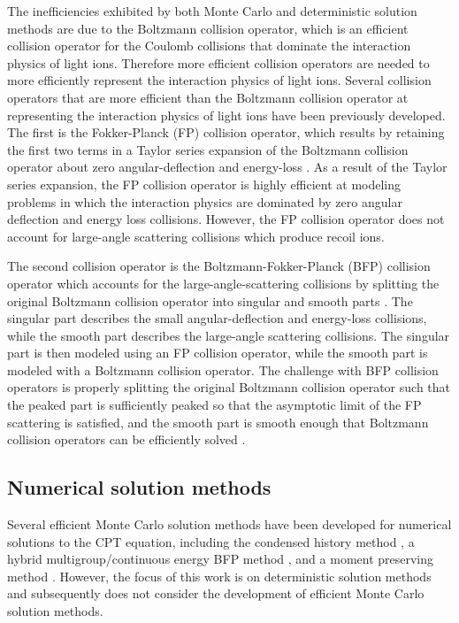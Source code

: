 The inefficiencies exhibited by both Monte Carlo and deterministic solution methods are due to the Boltzmann collision operator, which is an efficient collision operator for the Coulomb collisions that dominate the interaction physics of light ions. Therefore more efficient collision operators are needed to more efficiently represent the interaction physics of light ions. Several collision operators that are more efficient than the Boltzmann collision operator at representing the interaction physics of light ions have been previously developed. The first is the Fokker-Planck (FP) collision operator, which results by retaining the first two terms in a Taylor series expansion of the Boltzmann collision operator about zero angular-deflection and energy-loss \cite{Pomraning-1996}. As a result of the Taylor series expansion, the FP collision operator is highly efficient at modeling problems in which the interaction physics are dominated by zero angular deflection and energy loss collisions. However, the FP collision operator does not account for large-angle scattering collisions which produce recoil ions. 

The second collision operator is the Boltzmann-Fokker-Planck (BFP) collision operator which accounts for the large-angle-scattering collisions by splitting the original Boltzmann collision operator into singular and smooth parts \cite{Ligou-1986}. The singular part describes the small angular-deflection and energy-loss collisions, while the smooth part describes the large-angle scattering collisions. The singular part is then modeled using an FP collision operator, while the smooth part is modeled with a Boltzmann collision operator. The challenge with BFP collision operators is properly splitting the original Boltzmann collision operator such that the peaked part is sufficiently peaked so that the asymptotic limit of the FP scattering is satisfied, and the smooth part is smooth enough that Boltzmann collision operators can be efficiently solved \cite{Pomraning-1992}. 

\subsection{Numerical solution methods}
Several efficient Monte Carlo solution methods have been developed for numerical solutions to the CPT equation, including the condensed history method \cite{Berger-1963}, a hybrid multigroup/continuous energy BFP method \cite{Morel-1996}, and a moment preserving method \cite{Dixon-2015}. However, the focus of this work is on deterministic solution methods and subsequently does not consider the development of efficient Monte Carlo solution methods. 


